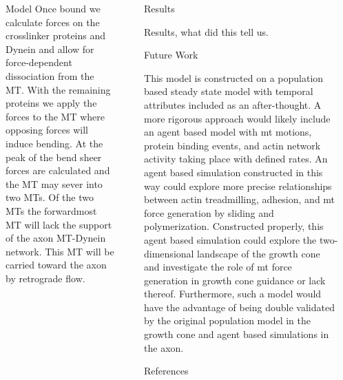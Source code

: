 \documentclass{beamer}
\newlength{\sepwidth}
\newlength{\colwidth}
\newcommand{\separatorcolumn}{\begin{column}{\sepwidth}\end{column}}
\begin{document}
\begin{frame}[t]
\begin{columns}[t]
\begin{column}{\colwidth}
\begin{block}{Model}
Once bound we calculate forces on the crosslinker proteins and Dynein and allow for force-dependent dissociation from the MT. With the remaining proteins we apply the forces to the MT where opposing forces will induce bending. At the peak of the bend sheer forces are calculated and the MT may sever into two MTs. Of the two MTs the forwardmost MT will lack the support of the axon MT-Dynein network. This MT will be carried toward the axon by retrograde flow.

\end{block}

\end{column}
\separatorcolumn%


\begin{column}{\colwidth}

\begin{block}{Results}

Results, what did this tell us.

\end{block}

\begin{block}{Future Work}

This model is constructed on a population based steady state model with temporal attributes included as an after-thought. A more rigorous approach would likely include an agent based model with mt motions, protein binding events, and actin network activity taking place with defined rates. An agent based simulation constructed in this way could explore more precise relationships between actin treadmilling, adhesion, and mt force generation by sliding and polymerization. Constructed properly, this agent based simulation could explore the two-dimensional landscape of the growth cone and investigate the role of mt force generation in growth cone guidance or lack thereof. Furthermore, such a model would have the advantage of being double validated by the original population model in the growth cone and agent based simulations in the axon.

\end{block}

\begin{block}{References}
\begin{multicols}{2}
\fontsize{16pt}{12pt}\selectfont
\nocite{craig2015pb, craig2012bj, devincentiis2020jn, kalil2005con, nedelec1997n13, raffa2023scdb, sanchez-huertas2021fmn}


\end{multicols}
\end{block}

\end{column}
\separatorcolumn%

\end{columns}
\end{frame}
\end{document}
